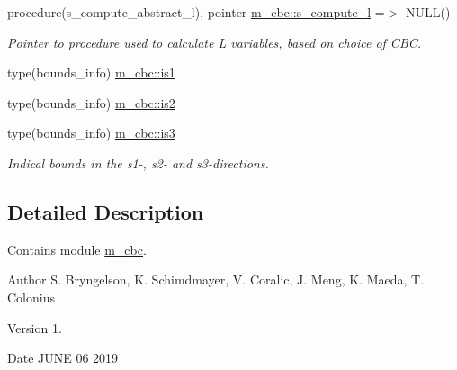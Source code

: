 \begin{DoxyCompactItemize}
\item 
procedure(s\+\_\+compute\+\_\+abstract\+\_\+l), pointer \hyperlink{namespacem__cbc_a6ba3d055b8d3c0d003ff74ccd2762b1c}{m\+\_\+cbc\+::s\+\_\+compute\+\_\+l} =$>$ N\+U\+LL()
\begin{DoxyCompactList}\small\item\em Pointer to procedure used to calculate L variables, based on choice of C\+BC. \end{DoxyCompactList}\item 
type(bounds\+\_\+info) \hyperlink{namespacem__cbc_a2995ecb6263724a4421d1622f513103c}{m\+\_\+cbc\+::is1}
\item 
type(bounds\+\_\+info) \hyperlink{namespacem__cbc_acfe8efda790266c75260db5e3917d337}{m\+\_\+cbc\+::is2}
\item 
type(bounds\+\_\+info) \hyperlink{namespacem__cbc_a8477d940e9515138e8405c9302a026c8}{m\+\_\+cbc\+::is3}
\begin{DoxyCompactList}\small\item\em Indical bounds in the s1-\/, s2-\/ and s3-\/directions. \end{DoxyCompactList}\end{DoxyCompactItemize}


\subsection{Detailed Description}
Contains module \hyperlink{namespacem__cbc}{m\+\_\+cbc}. 

\begin{DoxyAuthor}{Author}
S. Bryngelson, K. Schimdmayer, V. Coralic, J. Meng, K. Maeda, T. Colonius 
\end{DoxyAuthor}
\begin{DoxyVersion}{Version}
1. 
\end{DoxyVersion}
\begin{DoxyDate}{Date}
J\+U\+NE 06 2019 
\end{DoxyDate}
